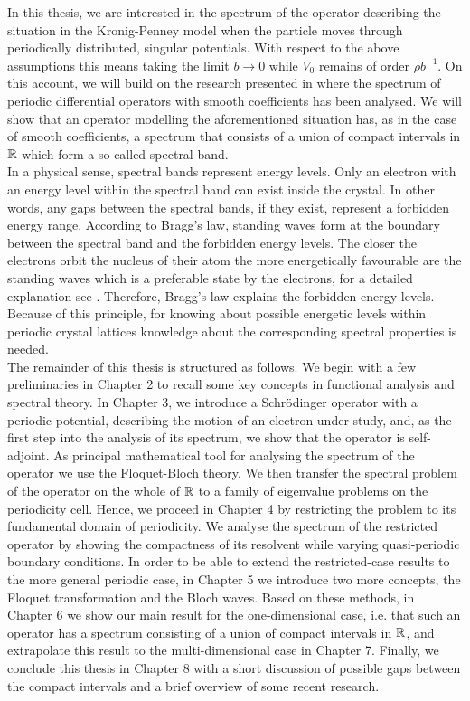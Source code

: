 In this thesis, we are interested in the spectrum of the operator describing the situation in the Kronig-Penney model when the particle moves through periodically distributed, singular potentials. With respect to the above assumptions	 this means taking the limit $b \rightarrow 0$ while $V_{0}$ remains of order $\rho b^{-1}$. On this account, we will build on the research presented in \cite{dorfler2011photonic} where the spectrum of periodic differential operators with smooth coefficients has been analysed. We will show that an operator modelling the aforementioned situation has, as in the case of smooth coefficients, a spectrum that consists of a union of compact intervals in $\mathbb{R}$ which form a so-called spectral band. 
~\\

In a physical sense, spectral bands represent energy levels. Only an electron with an energy level within the spectral band can exist inside the crystal. In other words, any gaps between the spectral bands, if they exist, represent a forbidden energy range. According to Bragg's law, standing waves form at the boundary between the spectral band and the forbidden energy levels. The closer the electrons orbit the nucleus of their atom the more energetically favourable are the standing waves which is a preferable state by the electrons, for a detailed explanation see \cite[Section 3.2]{heering2002elektrophysik}. Therefore, Bragg's law explains the forbidden energy levels. Because of this principle, for knowing about possible energetic levels within periodic crystal lattices knowledge about the corresponding spectral properties is needed.
~\\

The remainder of this thesis is structured as follows. We begin with a few preliminaries in Chapter 2 to recall some key concepts in functional analysis and spectral theory. In Chapter 3, we introduce a Schrödinger operator with a periodic potential, describing the motion of an electron under study, and, as the first step into the analysis of its spectrum, we show that the operator is self-adjoint. As principal mathematical tool for analysing the spectrum of the operator we use the Floquet-Bloch theory. We then transfer the spectral problem of the operator on the whole of $\mathbb{R}$ to a family of eigenvalue problems on the periodicity cell. Hence, we proceed in Chapter 4 by restricting the problem to its fundamental domain of periodicity. We analyse the spectrum of the restricted operator by showing the compactness of its resolvent while varying quasi-periodic boundary conditions. In order to be able to extend the restricted-case results to the more general periodic case, in Chapter 5 we introduce two more concepts, the Floquet transformation and the Bloch waves. Based on these methods, in Chapter 6 we show our main result for the one-dimensional case, i.e. that such an operator has a spectrum consisting of a union of compact intervals in $\mathbb{R}$, and extrapolate this result to the multi-dimensional case in Chapter 7. Finally, we conclude this thesis in Chapter 8 with a short discussion of possible gaps between the compact intervals and a brief overview of some recent research.